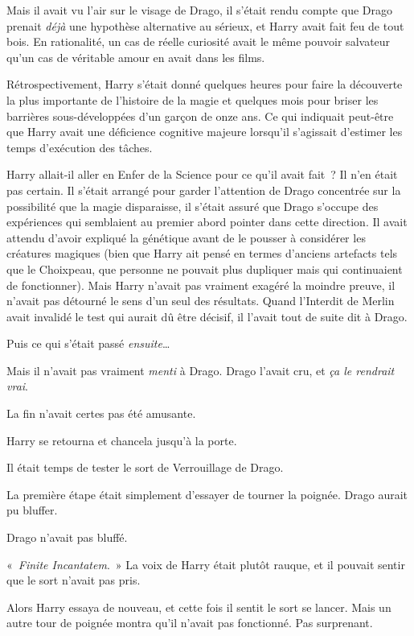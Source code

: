 Mais il avait vu l'air sur le visage de Drago, il s'était rendu compte que Drago prenait \emph{déjà} une hypothèse alternative au sérieux, et Harry avait fait feu de tout bois.
En rationalité, un cas de réelle curiosité avait le même pouvoir salvateur qu'un cas de véritable amour en avait dans les films.

Rétrospectivement, Harry s'était donné quelques heures pour faire la découverte la plus importante de l'histoire de la magie et quelques mois pour briser les barrières sous-développées d'un garçon de onze ans.
Ce qui indiquait peut-être que Harry avait une déficience cognitive majeure lorsqu'il s'agissait d'estimer les temps d'exécution des tâches.

Harry allait-il aller en Enfer de la Science pour ce qu'il avait fait~?
Il n'en était pas certain.
Il s'était arrangé pour garder l'attention de Drago concentrée sur la possibilité que la magie disparaisse, il s'était assuré que Drago s'occupe des expériences qui semblaient au premier abord pointer dans cette direction.
Il avait attendu d'avoir expliqué la génétique avant de le pousser à considérer les créatures magiques (bien que Harry ait pensé en termes d'anciens artefacts tels que le Choixpeau, que personne ne pouvait plus dupliquer mais qui continuaient de fonctionner).
Mais Harry n'avait pas vraiment exagéré la moindre preuve, il n'avait pas détourné le sens d'un seul des résultats.
Quand l'Interdit de Merlin avait invalidé le test qui aurait dû être décisif, il l'avait tout de suite dit à Drago.

Puis ce qui s'était passé \emph{ensuite}…

Mais il n'avait pas vraiment \emph{menti} à Drago.
Drago l'avait cru, et \emph{ça le rendrait vrai}.

La fin n'avait certes pas été amusante.

Harry se retourna et chancela jusqu'à la porte.

Il était temps de tester le sort de Verrouillage de Drago.

La première étape était simplement d'essayer de tourner la poignée.
Drago aurait pu bluffer.

Drago n'avait pas bluffé.

«~\emph{Finite Incantatem}.~»
La voix de Harry était plutôt rauque, et il pouvait sentir que le sort n'avait pas pris.

Alors Harry essaya de nouveau, et cette fois il sentit le sort se lancer.
Mais un autre tour de poignée montra qu'il n'avait pas fonctionné.
Pas surprenant.


